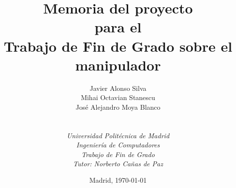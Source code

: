 
\def\Company{Consultancy}
\def\Institute{\textit{Universidad Politécnica de Madrid}}
\def\Course{\textit{Ingeniería de Computadores}}
\def\Module{\textit{Trabajo de Fin de Grado}}
\def\Docent{\textit{Tutor: Norberto Cañas de Paz}}
\def\Assistant{}

\def\BoldTitle{Memoria del proyecto}

\def\Subtitle{para el \\ Trabajo de Fin de Grado sobre el manipulador \pArm{} \\}
\def\Authors{Javier Alonso Silva \\ Mihai Octavian Stanescu \\ José Alejandro Moya Blanco } 
\def\Shortname{J. Alonso, M. Stanescu, A. Moya}


\title{\textbf{\BoldTitle}\\\Subtitle}
\author{\Authors \\ \\ \\ \Institute\\ \Course\\ \Module\\ \Docent}
\date{Madrid, \today{}}

